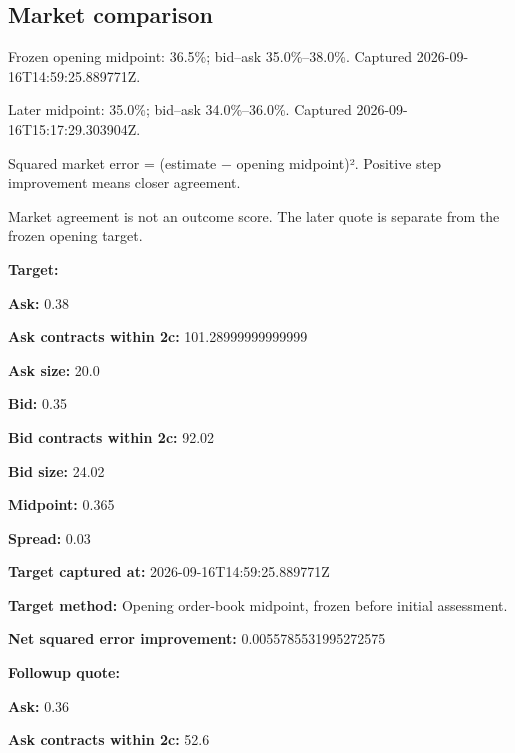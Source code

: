 \documentclass[11pt]{article}
\begin{document}
\subsection*{\textcolor{epdarkgreen}{Market comparison}}
Frozen opening midpoint: 36.5\%; bid–ask 35.0\%–38.0\%. Captured 2026-09-16T14:59:25.889771Z.


Later midpoint: 35.0\%; bid–ask 34.0\%–36.0\%. Captured 2026-09-16T15:17:29.303904Z.


Squared market error = (estimate − opening midpoint)². Positive step improvement means closer agreement.


Market agreement is not an outcome score. The later quote is separate from the frozen opening target.


\par\noindent\textbf{Target:} \par \par\noindent\textbf{Ask:} 0.38

\par\noindent\textbf{Ask contracts within 2c:} 101.28999999999999

\par\noindent\textbf{Ask size:} 20.0

\par\noindent\textbf{Bid:} 0.35

\par\noindent\textbf{Bid contracts within 2c:} 92.02

\par\noindent\textbf{Bid size:} 24.02

\par\noindent\textbf{Midpoint:} 0.365

\par\noindent\textbf{Spread:} 0.03

\par\noindent\textbf{Target captured at:} 2026-09-16T14:59:25.889771Z

\par\noindent\textbf{Target method:} Opening order-book midpoint, frozen before initial assessment.

\par\noindent\textbf{Net squared error improvement:} 0.0055785531995272575

\par\noindent\textbf{Followup quote:} \par \par\noindent\textbf{Ask:} 0.36

\par\noindent\textbf{Ask contracts within 2c:} 52.6
\end{document}
